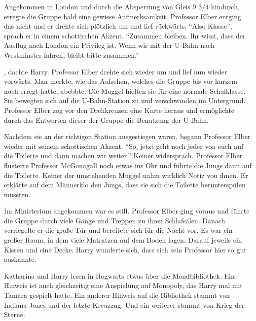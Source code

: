 Angekommen in London und durch die Absperrung von Gleis 9 3/4 hindurch, erregte die Gruppe bald eine gewisse Aufmerksamkeit. Professor Elber entging das nicht und er drehte sich plötzlich um und lief rückwärts. \enquote{Also Klasse}, sprach er in einem schottischen Akzent. \enquote{Zusammen bleiben. Ihr wisst, dass der Ausflug nach London ein Privileg ist. Wenn wir mit der U-Bahn nach Westminster fahren, bleibt bitte zusammen.}

, dachte Harry.  Professor Elber drehte sich wieder um und lief nun wieder vorwärts. Man merkte, wie das Aufsehen, welches die Gruppe bis vor kurzem noch erregt hatte, abebbte. Die Muggel hielten sie für eine normale Schulklasse. Sie bewegten sich auf die U-Bahn-Station zu und verschwanden im Untergrund. Professor Elber zog vor den Drehkreuzen eine Karte heraus und ermöglichte durch das Entwerten dieser der Gruppe die Benutzung der U-Bahn.

Nachdem sie an der richtigen Station ausgestiegen waren, begann Professor Elber wieder mit seinem schottischen Akzent. \enquote{So, jetzt geht noch jeder von euch auf die Toilette und dann machen wir weiter.} Keiner widersprach. Professor Elber flüsterte Professor McGonagall noch etwas ins Ohr und führte die Jungs dann auf die Toilette. Keiner der umstehenden Muggel nahm wirklich Notiz von ihnen. Er erklärte auf dem Männerklo den Jungs, dass sie sich die Toilette herunterspülen müssten.

Im Ministerium angekommen war es still. Professor Elber ging voraus und führte die Gruppe durch viele Gänge und Treppen zu ihren Schlafsälen. Danach verriegelte er die große Tür und bereitete sich für die Nacht vor. Es war ein großer Raum, in dem viele Matratzen auf dem Boden lagen. Darauf jeweils ein Kissen und eine Decke. Harry wunderte sich, dass sich sein Professor hier so gut auskannte.




\begin{kommentar}
Katharina und Harry lesen in Hogwarts etwas über die Mondbibliothek. Ein Hinweis ist auch gleichzeitig eine Anspielung auf Monopoly, das Harry mal mit Tamara gespielt hatte. Ein anderer Hinweis auf die Bibliothek stammt von Indiana Jones und der letzte Kreuzzug. Und ein weiterer stammt von Krieg der Sterne.
\end{kommentar}
